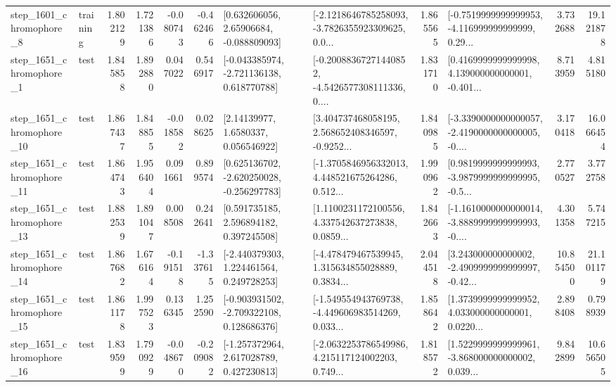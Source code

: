 \begin{tabular}{llrrrrllrlrr}
  step\_1601\_chromophore\_8 &  training &      1.802129 &    1.721386 &     -0.080743 & -0.462466 &     [0.632606056, 2.65906684, -0.088809093] &  [-2.1218646785258093, -3.7826355923309625, 0.0... &       1.865565 &  [-0.7519999999999953, -4.116999999999999, 0.29... &            3.732688 &         19.121878 \\
  step\_1651\_chromophore\_1 &      test &      1.845858 &    1.892880 &      0.047022 &  0.546917 &   [-0.043385974, -2.721136138, 0.618770788] &  [-0.20088367271440852, -4.5426577308111336, 0.... &       1.831710 &  [0.4169999999999998, 4.139000000000001, -0.401... &            8.713959 &          4.815180 \\
 step\_1651\_chromophore\_10 &      test &      1.867437 &    1.848855 &     -0.018582 &  0.028625 &        [2.14139977, 1.6580337, 0.056546922] &  [3.404737468058195, 2.568652408346597, -0.9252... &       1.840985 &  [-3.3390000000000057, -2.4190000000000005, -0.... &            3.170418 &         16.066454 \\
 step\_1651\_chromophore\_11 &      test &      1.864743 &    1.956404 &      0.091661 &  0.899574 &   [0.625136702, -2.620250028, -0.256297783] &  [-1.3705846956332013, 4.448521675264286, 0.512... &       1.990962 &  [0.9819999999999993, -3.9879999999999995, -0.5... &            2.770527 &          3.772758 \\
 step\_1651\_chromophore\_13 &      test &      1.882539 &    1.891047 &      0.008508 &  0.242641 &     [0.591735185, 2.596894182, 0.397245508] &  [1.1100231172100556, 4.337542637273838, 0.0859... &       1.842663 &  [-1.1610000000000014, -3.8889999999999993, -0.... &            4.301358 &          5.747215 \\
 step\_1651\_chromophore\_14 &      test &      1.867682 &    1.676164 &     -0.191518 & -1.337615 &    [-2.440379303, 1.224461564, 0.249728253] &  [-4.478479467539945, 1.315634855028889, 0.3834... &       2.044518 &  [3.243000000000002, -2.4909999999999997, -0.42... &           10.854500 &         21.101179 \\
 step\_1651\_chromophore\_15 &      test &      1.861178 &    1.997523 &      0.136345 &  1.252590 &   [-0.903931502, -2.709322108, 0.128686376] &  [-1.549554943769738, -4.449606983514269, 0.033... &       1.858642 &  [1.3739999999999952, 4.033000000000001, 0.0220... &            2.898408 &          0.798939 \\
 step\_1651\_chromophore\_16 &      test &      1.839599 &    1.790929 &     -0.048670 & -0.209082 &    [-1.257372964, 2.617028789, 0.427230813] &  [-2.0632253786549986, 4.215117124002203, 0.749... &       1.818572 &  [1.5229999999999961, -3.868000000000002, 0.039... &            9.842899 &         10.656505 \\

\end{tabular}
